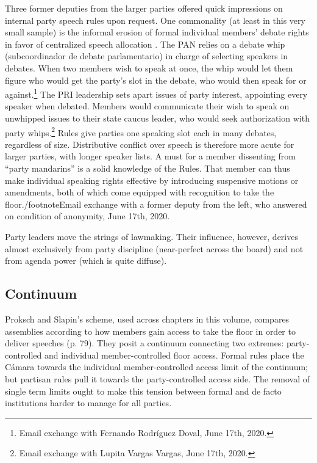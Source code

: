 \documentclass[letter,12pt]{article}
\begin{document}
Three former deputies from the larger parties offered quick impressions on internal party speech rules upon request. One commonality (at least in this very small sample) is the informal erosion of formal individual members' debate rights in favor of centralized speech allocation \citep[cf.][]{cox.1987}. The PAN relies on a debate whip (subcoordinador de debate parlamentario) in charge of selecting speakers in debates. When two members wish to speak at once, the whip would let them figure who would get the party's slot in the debate, who would then speak for or against.\footnote{Email exchange with Fernando Rodríguez Doval, June 17th, 2020.} The PRI leadership sets apart issues of party interest, appointing every speaker when debated. Members would communicate their wish to speak on unwhipped issues to their state caucus leader, who would seek authorization with party whips.\footnote{Email exchange with Lupita Vargas Vargas, June 17th, 2020.} Rules give parties one speaking slot each in many debates, regardless of size. Distributive conflict over speech is therefore more acute for larger parties, with longer speaker lists. A must for a member dissenting from ``party mandarins'' is a solid knowledge of the Rules. That member can thus make individual speaking rights effective by introducing suspensive motions or amendments, both of which come equipped with recognition to take the floor./footnote{Email exchange with a former deputy from the left, who answered on condition of anonymity, June 17th, 2020.} 

Party leaders move the strings of lawmaking. Their influence, however, derives almost exclusively from party discipline (near-perfect across the board) and not from agenda power (which is quite diffuse). 

  \subsection{Continuum}

Proksch and Slapin's \citeyearpar{proksch-slapin2015book} scheme, used across chapters in this volume, compares assemblies according to how members gain access to take the floor in order to deliver speeches (p. 79). They posit a continuum connecting two extremes: party-controlled and individual member-controlled floor access. Formal rules place the Cámara towards the individual member-controlled access limit of the continuum; but partisan rules pull it towards the party-controlled access side. The removal of single term limits ought to make this tension between formal and de facto institutions harder to manage for all parties.  
\end{document}
